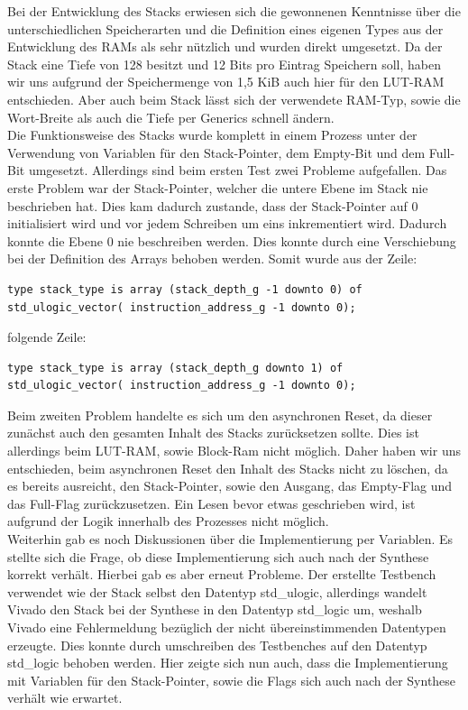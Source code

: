 \documentclass[bibliography=totoc,listof=totoc,index=totoc]{scrartcl}
\begin{document}
Bei der Entwicklung des Stacks erwiesen sich die gewonnenen Kenntnisse über die unterschiedlichen Speicherarten und die Definition eines eigenen Types aus der Entwicklung des RAMs als sehr nützlich und wurden direkt umgesetzt. Da der Stack eine Tiefe von 128 besitzt und 12 Bits pro Eintrag Speichern soll, haben wir uns aufgrund der Speichermenge von 1,5 KiB  auch hier für den LUT-RAM entschieden. Aber auch beim Stack lässt sich der verwendete RAM-Typ, sowie die Wort-Breite als auch die Tiefe per Generics schnell ändern. \\
Die Funktionsweise des Stacks wurde komplett in einem Prozess unter der Verwendung von Variablen für den Stack-Pointer, dem Empty-Bit und dem Full-Bit umgesetzt. Allerdings sind beim ersten Test zwei Probleme aufgefallen. Das erste Problem war der Stack-Pointer, welcher die untere Ebene im Stack nie beschrieben hat. Dies kam dadurch zustande, dass der Stack-Pointer auf 0 initialisiert wird und vor jedem Schreiben um eins inkrementiert wird. Dadurch konnte die Ebene 0 nie beschreiben werden. Dies konnte durch eine Verschiebung bei der Definition des Arrays behoben werden. Somit wurde aus der Zeile:
\begin{small}
\begin{verbatim}
type stack_type is array (stack_depth_g -1 downto 0) of std_ulogic_vector( instruction_address_g -1 downto 0);
\end{verbatim}
\end{small}
folgende Zeile:
\begin{small}
\begin{verbatim}
type stack_type is array (stack_depth_g downto 1) of std_ulogic_vector( instruction_address_g -1 downto 0);
\end{verbatim}
\end{small}
 Beim zweiten Problem handelte es sich um den asynchronen Reset, da dieser zunächst auch den gesamten Inhalt des Stacks zurücksetzen sollte. Dies ist allerdings beim LUT-RAM, sowie Block-Ram nicht möglich. Daher haben wir uns entschieden, beim asynchronen Reset den Inhalt des Stacks nicht zu löschen, da es bereits ausreicht, den Stack-Pointer, sowie den Ausgang, das Empty-Flag und das Full-Flag zurückzusetzen. Ein Lesen bevor etwas geschrieben wird, ist aufgrund der Logik innerhalb des Prozesses nicht möglich. \\
 Weiterhin gab es noch Diskussionen über die Implementierung per Variablen. Es stellte sich die Frage, ob diese Implementierung sich auch nach der Synthese korrekt verhält. Hierbei gab es aber erneut Probleme. Der erstellte Testbench verwendet wie der Stack selbst den Datentyp std\_ulogic, allerdings wandelt Vivado den Stack bei der Synthese in den Datentyp std\_logic um, weshalb Vivado eine Fehlermeldung bezüglich der nicht übereinstimmenden Datentypen erzeugte. Dies konnte durch umschreiben des Testbenches auf den Datentyp std\_logic behoben werden. Hier zeigte sich nun auch, dass die Implementierung mit Variablen für den Stack-Pointer, sowie die Flags sich auch nach der Synthese verhält wie erwartet.
\end{document}
